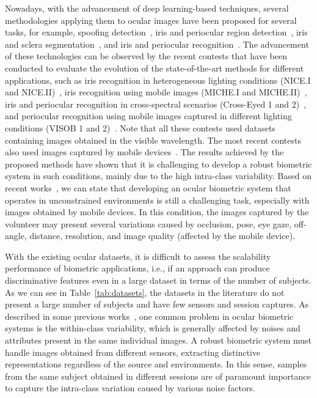 \documentclass[journal]{IEEEtran}
\begin{document}
Nowadays, with the advancement of deep learning-based techniques, several methodologies applying them to ocular images have been proposed for several tasks, for example, spoofing detection~\cite{Menotti2015, He2016}, iris and periocular region detection~\cite{Silva2015, lucio2019simultaneous, severo2018benchmark}, iris and sclera segmentation~\cite{lucio2018fully, bezerra2018robust}, and iris and periocular recognition~\cite{Du2016, Luz2018, Zhao2019capsule, diaz2020spectrum, zanlorensi2018impact, silva2018multimodal, hern2020crossspectral}.
The advancement of these technologies can be observed by the recent contests that have been conducted to evaluate the evolution of the state-of-the-art methods for different applications, such as iris recognition in heterogeneous lighting conditions (NICE.I and NICE.II)~\cite{Proenca2010, Proenca2012}, iris recognition using mobile images (MICHE.I and MICHE.II)~\cite{DeMarsico2015, DeMarsico2017}, iris and periocular recognition in cross-spectral scenarios (Cross-Eyed 1 and 2)~\cite{Sequeira2016,Sequeira2017}, and periocular recognition using mobile images captured in different lighting conditions (VISOB 1 and 2)~\cite{Rattani2016}.
Note that all these contests used datasets containing images obtained in the visible wavelength.
The most recent contests also used images captured by mobile devices~\cite{Rattani2016, DeMarsico2017}.
The results achieved by the proposed methods have shown that it is challenging to develop a robust biometric system in such conditions, mainly due to the high intra-class variability.
Based on recent works~\cite{DeMarsico2017, zanlorensi2019ocular, zanlorensi2020attnormalization}, we can state that developing an ocular biometric system that operates in unconstrained environments is still a challenging task, especially with images obtained by mobile devices.
In this condition, the images captured by the volunteer may present several variations caused by occlusion, pose, eye gaze, off-angle, distance, resolution, and image quality (affected by the mobile device).

With the existing ocular datasets, it is difficult to assess the scalability performance of biometric applications, i.e., if an approach can produce discriminative features even in a large dataset in terms of the number of subjects.
As we can see in Table~\ref{tab:datasets}, the datasets in the literature do not present a large number of subjects and have few sensors and session captures.
As described in some previous works~\cite{zanlorensi2020deep, zanlorensi2020attnormalization}, one common problem in ocular biometric systems is the within-class variability, which is generally affected by noises and attributes present in the same individual images.
A robust biometric system must handle images obtained from different sensors, extracting distinctive representations regardless of the source and environments.
In this sense, samples from the same subject obtained in different sessions are of paramount importance to capture the intra-class variation caused by various noise factors.
\end{document}
